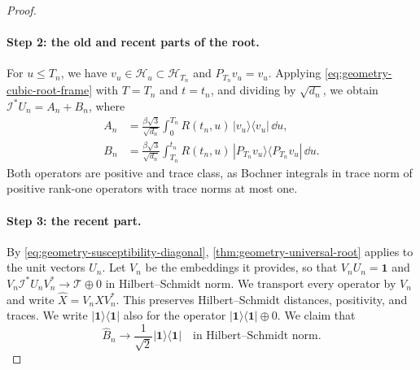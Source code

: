 \begin{proof}
\paragraph{Step 2: the old and recent parts of the root.}
For $u\le T_n$, we have $v_u\in\mathcal H_u\subset\mathcal H_{T_n}$ and $P_{T_n}v_u=v_u$. Applying \eqref{eq:geometry-cubic-root-frame} with $T=T_n$ and $t=t_n$, and dividing by $\sqrt{d_n}$, we obtain $\mathcal I^*U_n=A_n+B_n$, where
\begin{align*}
 A_n&=\frac{\beta\sqrt3}{\sqrt{d_n}}\int_0^{T_n}R(t_n,u)\,|v_u\rangle\langle v_u|\,\dd u,\\
 B_n&=\frac{\beta\sqrt3}{\sqrt{d_n}}\int_{T_n}^{t_n}R(t_n,u)\,|P_{T_n}v_u\rangle\langle P_{T_n}v_u|\,\dd u .
\end{align*}
Both operators are positive and trace class, as Bochner integrals in trace norm of positive rank-one operators with trace norms at most one.

\paragraph{Step 3: the recent part.}
By \eqref{eq:geometry-susceptibility-diagonal}, \cref{thm:geometry-universal-root} applies to the unit vectors $U_n$. Let $V_n$ be the embeddings it provides, so that $V_nU_n=\mathbf1$ and $V_n\mathcal I^*U_nV_n^*\to\mathcal T\oplus0$ in Hilbert--Schmidt norm. We transport every operator by $V_n$ and write $\widehat X=V_nXV_n^*$. This preserves Hilbert--Schmidt distances, positivity, and traces. We write $|\mathbf1\rangle\langle\mathbf1|$ also for the operator $|\mathbf1\rangle\langle\mathbf1|\oplus0$. We claim that
\begin{equation}
 \widehat B_n\longrightarrow\frac1{\sqrt2}|\mathbf1\rangle\langle\mathbf1|\quad\text{in Hilbert--Schmidt norm.}
 \label{eq:geometry-recent-root-atom}
\end{equation}


\end{proof}
